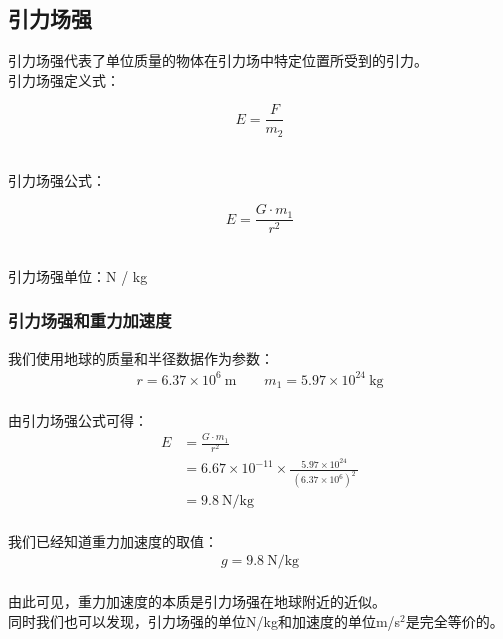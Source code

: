 \documentclass[UTF8]{ctexart}
\begin{document}
\newpage

\subsection{引力场强}
    引力场强代表了单位质量的物体在引力场中特定位置所受到的引力。\\[3mm]
    引力场强定义式：\vspace{3pt}
    \begin{large}
        \begin{equation*}
            E=\frac{F}{m_2}
        \end{equation*}
    \end{large}\\
    引力场强公式：\vspace{3pt}
    \begin{large}
        \begin{equation*}
            E=\frac{G\cdot m_{1}}{{r}^{2}}       
        \end{equation*}
    \end{large}\\
    引力场强单位：N / kg\vspace{5pt}

\subsubsection{引力场强和重力加速度}
    我们使用地球的质量和半径数据作为参数：\vspace{5pt}
    \setcounter{equation}{0}
    \begin{align}
        r=6.37\times 10^6~\text{m}\qquad m_1=5.97\times 10^{24}~\text{kg}
    \end{align}\\
    由引力场强公式可得：
    \begin{align}
        E&=\frac{G\cdot m_1}{r^2}\\[4mm]
        &=6.67\times 10^{-11}\times\frac{5.97\times 10^{24}}{~\left(6.37\times 10^{6}\right)^2~}\\[4mm]
        &=9.8~\text{N/kg}
    \end{align}\\
    我们已经知道重力加速度的取值：
    \begin{align}
        g=9.8~\text{N/kg}
    \end{align}\\
    由此可见，重力加速度的本质是引力场强在地球附近的近似。\\[3mm]
    同时我们也可以发现，引力场强的单位N/kg和加速度的单位m/s$^2$是完全等价的。
\end{document}
